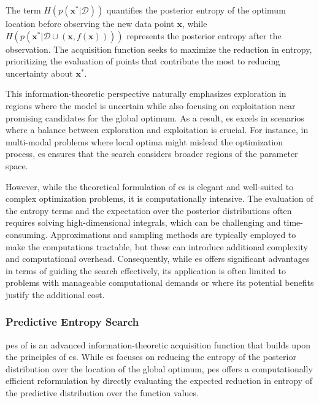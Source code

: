 The term $H(p(\mathbf{x}^*|\mathcal{D}))$ quantifies the posterior entropy of the optimum location before observing the new data point $\mathbf{x}$, while $H(p(\mathbf{x}^*|\mathcal{D} \cup (\mathbf{x}, f(\mathbf{x}))))$ represents the posterior entropy after the observation. The acquisition function seeks to maximize the reduction in entropy, prioritizing the evaluation of points that contribute the most to reducing uncertainty about $\mathbf{x}^*$.

This information-theoretic perspective naturally emphasizes exploration in regions where the model is uncertain while also focusing on exploitation near promising candidates for the global optimum. As a result, \ac{es} excels in scenarios where a balance between exploration and exploitation is crucial. For instance, in multi-modal problems where local optima might mislead the optimization process, \ac{es} ensures that the search considers broader regions of the parameter space.

However, while the theoretical formulation of \ac{es} is elegant and well-suited to complex optimization problems, it is computationally intensive. The evaluation of the entropy terms and the expectation over the posterior distributions often requires solving high-dimensional integrals, which can be challenging and time-consuming. Approximations and sampling methods are typically employed to make the computations tractable, but these can introduce additional complexity and computational overhead. Consequently, while \ac{es} offers significant advantages in terms of guiding the search effectively, its application is often limited to problems with manageable computational demands or where its potential benefits justify the additional cost.

\subsubsection{Predictive Entropy Search}
\acf{pes} of \citet{hernandez2014predictive} is an advanced information-theoretic acquisition function that builds upon the principles of \ac{es}. While \ac{es} focuses on reducing the entropy of the posterior distribution over the location of the global optimum, \ac{pes} offers a computationally efficient reformulation by directly evaluating the expected reduction in entropy of the predictive distribution over the function values.

